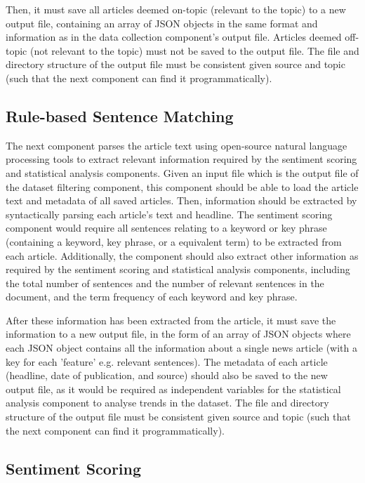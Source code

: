 \documentclass{report}
\begin{document}
Then, it must save all articles deemed on-topic (relevant to the topic) to a new output file, containing an array of JSON objects in the same format and information as in the data collection component's output file.
Articles deemed off-topic (not relevant to the topic) must not be saved to the output file.
The file and directory structure of the output file must be consistent given source and topic (such that the next component can find it programmatically).

\subsection{Rule-based Sentence Matching}

The next component parses the article text using open-source natural language processing tools to extract relevant information required by the sentiment scoring and statistical analysis components.
Given an input file which is the output file of the dataset filtering component, this component should be able to load the article text and metadata of all saved articles.
Then, information should be extracted by syntactically parsing each article's text and headline.
The sentiment scoring component would require all sentences relating to a keyword or key phrase (containing a keyword, key phrase, or a equivalent term) to be extracted from each article.
Additionally, the component should also extract other information as required by the sentiment scoring and statistical analysis components, including the total number of sentences and the number of relevant sentences in the document, and the term frequency of each keyword and key phrase.

After these information has been extracted from the article, it must save the information to a new output file, in the form of an array of JSON objects where each JSON object contains all the information about a single news article (with a key for each 'feature' e.g. relevant sentences).
The metadata of each article (headline, date of publication, and source) should also be saved to the new output file, as it would be required as independent variables for the statistical analysis component to analyse trends in the dataset.
The file and directory structure of the output file must be consistent given source and topic (such that the next component can find it programmatically).

\subsection{Sentiment Scoring}
\end{document}

